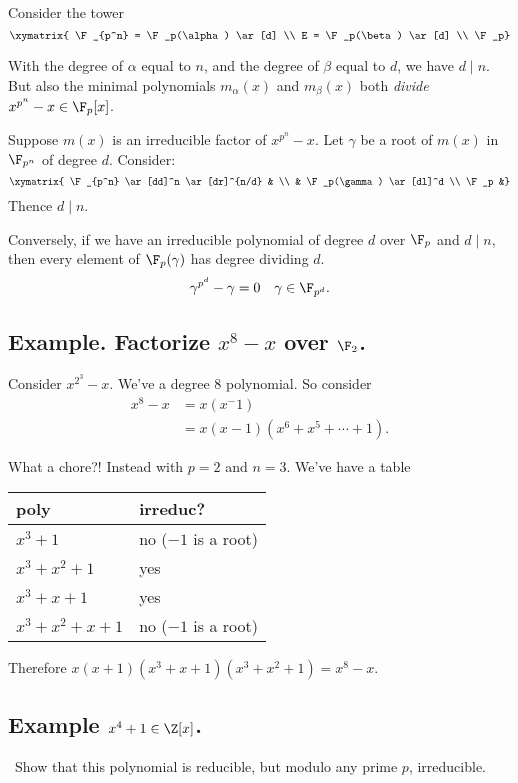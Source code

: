 Consider the tower \[\xymatrix{
    \F_{p^n} = \F_p(\alpha) \ar[d] \\
    E = \F_p(\beta) \ar[d] \\
    \F_p}\]

With the degree of \(\alpha\) equal to \(n\), and the degree of
\(\beta\) equal to \(d\), we have \(d \mid n\). But also the minimal
polynomials \(m_\alpha(x)\) and \(m_\beta(x)\) both \emph{divide}
\(x^{p^n} - x \in \F_{p}[x]\).

\pf Suppose \(m(x)\) is an irreducible factor of \(x^{p^n} -x\). Let
\(\gamma\) be a root of \(m(x)\) in \(\F_{p^n}\) of degree \(d\).
Consider: \[\xymatrix{
    \F_{p^n} \ar[dd]^n \ar[dr]^{n/d} & \\
    & \F_p(\gamma) \ar[dl]^d \\
    \F_p &}\] Thence \(d\mid n\).

Conversely, if we have an irreducible polynomial of degree \(d\) over
\(\F_p\) and \(d\mid n\), then every element of \(\F_p(\gamma)\) has
degree dividing \(d\).
\[\gamma^{p^d} - \gamma = 0 \quad \gamma \in \F_{p^d}.\]

\hypertarget{example.-factorize-x8---x-over-ff_2.}{%
\subsection{\texorpdfstring{Example. Factorize \(x^8 - x\) over
\(\F_2\).}{Example. Factorize x\^{}8 - x over \textbackslash F\_2.}}\label{example.-factorize-x8---x-over-ff_2.}}

Consider \(x^{2^3} -x\). We've a degree \(8\) polynomial. So consider
\begin{align*}
x^8 - x &= x(x^ -1)\\
    &= x (x -1) (x^6 + x^5 + \cdots + 1).
\end{align*}

What a chore?! Instead with \(p =2\) and \(n= 3\). We've have a table

\begin{longtable}[]{@{}ll@{}}
\toprule
poly & irreduc?\tabularnewline
\midrule
\endhead
\(x^3 + 1\) & no (\(-1\) is a root)\tabularnewline
\(x^3 +x^2 + 1\) & yes\tabularnewline
\(x^3 + x + 1\) & yes\tabularnewline
\(x^3 + x^2 + x + 1\) & no (\(-1\) is a root)\tabularnewline
\bottomrule
\end{longtable}

Therefore \(x(x+1)(x^3 + x + 1)(x^3+ x^2 + 1) = x^8 -x\). \qedsymbol

\hypertarget{example-x4-1-in-zzx.}{%
\subsection{\texorpdfstring{Example
\(x^4 + 1 \in \Z[x]\).}{Example x\^{}4 + 1 \textbackslash in \textbackslash Z{[}x{]}.}}\label{example-x4-1-in-zzx.}}

\TODO~Show that this polynomial is reducible, but modulo any prime
\(p\), irreducible.
